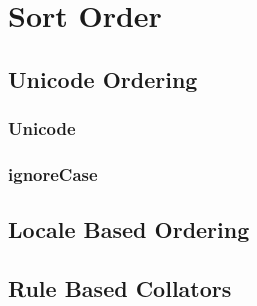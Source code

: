 
\chapter{Sort Order}

\INCOMPLETE

\section{Unicode Ordering}

\INCOMPLETE

\subsection{Unicode}

\INCOMPLETE

\subsection{ignoreCase}

\INCOMPLETE

\section{Locale Based Ordering}

\INCOMPLETE

\section{Rule Based Collators}

\INCOMPLETE




\endinput
%
